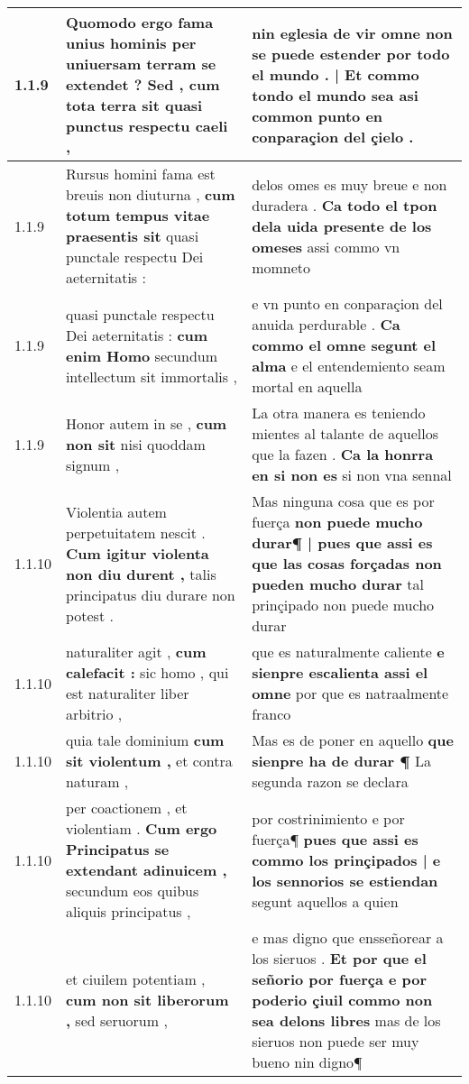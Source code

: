 \begin{tabular}{|p{1cm}|p{6.5cm}|p{6.5cm}|}
1.1.9 & Quomodo ergo fama unius hominis \textbf{ per uniuersam terram se extendet ? Sed , cum tota terra sit } quasi punctus respectu caeli , & nin eglesia de vir omne non se puede estender \textbf{ por todo el mundo . | Et commo tondo el mundo sea } asi common punto en conparaçion del çielo . \\\hline
1.1.9 & Rursus homini fama est breuis non diuturna , \textbf{ cum totum tempus vitae praesentis sit } quasi punctale respectu Dei aeternitatis : & delos omes es muy breue e non duradera . \textbf{ Ca todo el tpon dela uida presente de los omeses } assi commo vn momneto \\\hline
1.1.9 & quasi punctale respectu Dei aeternitatis : \textbf{ cum enim Homo } secundum intellectum sit immortalis , & e vn punto en conparaçion del anuida perdurable . \textbf{ Ca commo el omne segunt el alma } e el entendemiento seam mortal en aquella \\\hline
1.1.9 & Honor autem in se , \textbf{ cum non sit } nisi quoddam signum , & La otra manera es teniendo mientes al talante de aquellos que la fazen . \textbf{ Ca la honrra en si non es } si non vna sennal \\\hline
1.1.10 & Violentia autem perpetuitatem nescit . \textbf{ Cum igitur violenta non diu durent , } talis principatus diu durare non potest . & Mas ninguna cosa que es por fuerça \textbf{ non puede mucho durar¶ | pues que assi es que las cosas forçadas non pueden mucho durar } tal prinçipado non puede mucho durar \\\hline
1.1.10 & naturaliter agit , \textbf{ cum calefacit : } sic homo , qui est naturaliter liber arbitrio , & que es naturalmente caliente \textbf{ e sienpre escalienta assi el omne } por que es natraalmente franco \\\hline
1.1.10 & quia tale dominium \textbf{ cum sit violentum , } et contra naturam , & Mas es de poner en aquello \textbf{ que sienpre ha de durar ¶ } La segunda razon se declara \\\hline
1.1.10 & per coactionem , et violentiam . \textbf{ Cum ergo Principatus se extendant adinuicem , } secundum eos quibus aliquis principatus , & por costrinimiento e por fuerça¶ \textbf{ pues que assi es commo los prinçipados | e los sennorios se estiendan } segunt aquellos a quien \\\hline
1.1.10 & et ciuilem potentiam , \textbf{ cum non sit liberorum , } sed seruorum , & e mas digno que ensseñorear a los sieruos . \textbf{ Et por que el señorio por fuerça e por poderio çiuil commo non sea delons libres } mas de los sieruos non puede ser muy bueno nin digno¶ \\\hline

\end{tabular}
